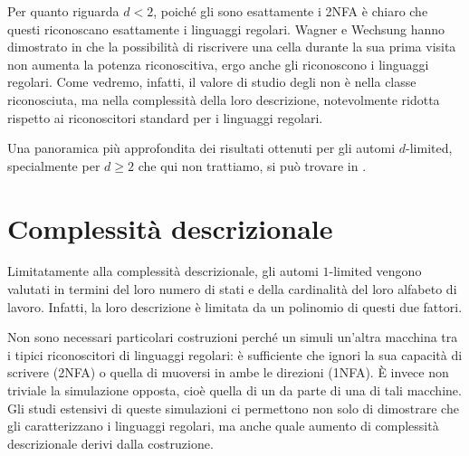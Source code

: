 Per quanto riguarda $d<2$, poiché gli  sono esattamente i 2NFA è chiaro che questi riconoscano esattamente i linguaggi regolari. Wagner e Wechsung hanno dimostrato in \cite{Wagner:86:compCompl} che la possibilità di riscrivere una cella durante la sua prima visita non aumenta la potenza riconoscitiva, ergo anche gli  riconoscono i linguaggi regolari. Come vedremo, infatti, il valore di studio degli  non è nella classe riconosciuta, ma nella complessità della loro descrizione, notevolmente ridotta rispetto ai riconoscitori standard per i linguaggi regolari.

Una panoramica più approfondita dei risultati ottenuti per gli automi $d$-limited, specialmente per $d\geq2$ che qui non trattiamo, si può trovare in \cite{Pighizzini:19:limited}.



\section{Complessità descrizionale}
Limitatamente alla complessità descrizionale, gli automi $1$-limited vengono valutati in termini del loro numero di stati e della cardinalità del loro alfabeto di lavoro. Infatti, la loro descrizione è limitata da un polinomio di questi due fattori.

Non sono necessari particolari costruzioni perché un  simuli un'altra macchina tra i tipici riconoscitori di linguaggi regolari: è sufficiente che ignori la sua capacità di scrivere (2NFA) o quella di muoversi in ambe le direzioni (1NFA). È invece non triviale la simulazione opposta, cioè quella di un  da parte di una di tali macchine. Gli studi estensivi di queste simulazioni ci permettono non solo di dimostrare che gli  caratterizzano i linguaggi regolari, ma anche quale aumento di complessità descrizionale derivi dalla costruzione.


